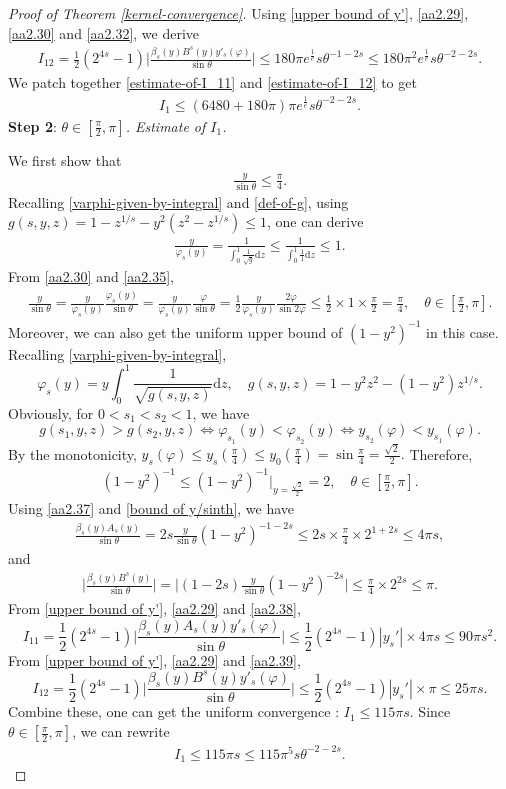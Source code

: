 \documentclass[reqno,10pt]{amsart}
\let\vf=\varphi
\def\th{\theta}
\newcommand{\ben}{\begin{eqnarray}}
\newcommand{\een}{\end{eqnarray}}
\theoremstyle{definition}
\numberwithin{equation}{section}
\begin{document}
\begin{proof}[Proof of Theorem \ref{kernel-convergence}]
Using \eqref{upper bound of y'}, \eqref{aa2.29}, \eqref{aa2.30} and \eqref{aa2.32}, we derive
\ben\label{estimate-of-I_12}
I_{12}=\frac{1}{2}(2^{4s}-1)\Big|\frac{\beta_s(y)B^{s}(y)y'_s(\varphi)}{\sin\th}\Big|\le 180\pi e^{\frac{1}{e}}s\th^{-1-2s}\le 180\pi^2e^{\frac{1}{e}}s\th^{-2-2s}.
\een
We patch together \eqref{estimate-of-I_11} and \eqref{estimate-of-I_12} to get
\ben\label{estimate of I_1-1}
I_1\le (6480+180\pi)\pi e^{\frac{1}{e}}s\th^{-2-2s}.
\een
\textbf{Step 2}: \emph{$\th\in[\frac{\pi}{2},\pi]$. Estimate of $I_1$.}

We first show that 
\ben\label{aa2.34}
\frac{y}{\sin\th}\le \frac{\pi}{4}.
\een
Recalling \eqref{varphi-given-by-integral} and \eqref{def-of-g}, using $g(s,y,z)=1-z^{1/s}-y^2(z^2-z^{1/s})\le1$, one can derive
\ben\label{aa2.35}
\frac{y}{\vf_s(y)}=\frac{1}{\int_{0}^{1}\frac{1}{\sqrt{g}}\mathrm{d}z}\le \frac{1}{\int_{0}^{1}\frac{1}{1}\mathrm{d}z} \le1.
\een
From \eqref{aa2.30} and \eqref{aa2.35},
\ben\label{bound of y/sinth}
\frac{y}{\sin\th}=\frac{y}{\vf_s(y)}\frac{\vf_s(y)}{\sin\th}=\frac{y}{\vf_s(y)}\frac{\vf}{\sin\th}=\frac{1}{2}\frac{y}{\vf_s(y)}\frac{2\vf}{\sin2\vf}\le \frac{1}{2}\times1\times\frac{\pi}{2}=\frac{\pi}{4}, \quad \th\in[\frac{\pi}{2},\pi].
\een
Moreover, we can also get the uniform upper bound of $(1-y^2)^{-1}$ in this case. Recalling \eqref{varphi-given-by-integral},
$$\vf_s(y)=y\int_{0}^{1}\frac{1}{\sqrt{g(s,y,z)}}\mathrm{d}z,\quad g(s,y,z)=1-y^2z^2-(1-y^2)z^{1/s}.$$
Obviously, for $0<s_1<s_2<1$, we have
$$g(s_1,y,z)>g(s_2,y,z)\iff \vf_{s_1}(y)<\vf_{s_2}(y)\iff y_{s_2}(\vf)<y_{s_1}(\vf).$$
By the monotonicity, $y_s(\vf)\le y_s(\frac{\pi}{4})\le y_0(\frac{\pi}{4})=\sin \frac{\pi}{4}=\frac{\sqrt{2}}{2}.$
Therefore,
\ben\label{aa2.37}
(1-y^2)^{-1}\le(1-y^2)^{-1}|_{y=\frac{\sqrt{2}}{2}}= 2,\quad \th\in[\frac{\pi}{2},\pi].
\een
Using \eqref{aa2.37} and \eqref{bound of y/sinth}, we have
\ben\label{aa2.38}
\frac{\beta_s(y)A_s(y)}{\sin\th}=2s\frac{y}{\sin\th}(1-y^2)^{-1-2s}\le 2s\times\frac{\pi}{4}\times2^{1+2s}\le 4\pi s,
\een
and
\ben\label{aa2.39}
\Big|\frac{\beta_s(y)B^{s}(y)}{\sin\th}\Big|=\Big|(1-2s)\frac{y}{\sin\th}(1-y^2)^{-2s}\Big|\le\frac{\pi}{4}\times 2^{2s}\le \pi.
\een
From \eqref{upper bound of y'}, \eqref{aa2.29} and \eqref{aa2.38},
$$I_{11}=\frac{1}{2}(2^{4s}-1)\Big|\frac{\beta_s(y)A_s(y)y'_s(\varphi)}{\sin\th}\Big|\le \frac{1}{2}(2^{4s}-1)|y_s'| \times4\pi s\le 90\pi s^{2}.$$
From \eqref{upper bound of y'}, \eqref{aa2.29} and \eqref{aa2.39},
$$I_{12}=\frac{1}{2}(2^{4s}-1)\Big|\frac{\beta_s(y)B^{s}(y)y'_s(\varphi)}{\sin\th}\Big|\le \frac{1}{2}(2^{4s}-1)|y_s'|\times \pi\le 25\pi s.$$
Combine these, one can get the uniform convergence : $I_{1}\le 115\pi s.$ Since $\th\in[\frac{\pi}{2},\pi]$, we can rewrite 
\ben\label{estimate of I_1-2}
I_{1}\le 115\pi s\le 115\pi^{5} s\th^{-2-2s}.
\een


\end{proof}
\end{document}

